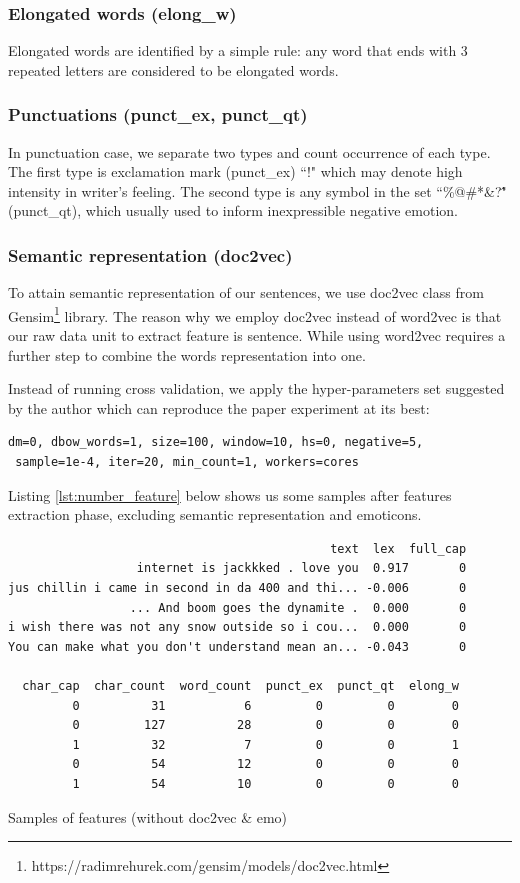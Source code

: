 \documentclass[12pt]{article}
\begin{document}
\subsubsection{Elongated words (elong\_w)}
Elongated words are identified by a simple rule: any word that ends with 3 repeated letters are considered to be elongated words.

\subsubsection{Punctuations (punct\_ex, punct\_qt)}
In punctuation case, we separate two types and count occurrence of each type. The first type is exclamation mark (punct\_ex) ``!" which may denote high intensity in writer's feeling. The second type is any symbol in the set ``\%@\#*\&?\^" (punct\_qt), which usually used to inform inexpressible negative emotion.

\subsubsection{Semantic representation (doc2vec)}
To attain semantic representation of our sentences, we use doc2vec class from Gensim\footnote{https://radimrehurek.com/gensim/models/doc2vec.html} library. The reason why we employ doc2vec instead of word2vec is that our raw data unit to extract feature is sentence. While using word2vec requires a further step to combine the words representation into one.

Instead of running cross validation, we apply the hyper-parameters set suggested by the author which can reproduce the paper experiment at its best:
\begin{verbatim}
dm=0, dbow_words=1, size=100, window=10, hs=0, negative=5,
 sample=1e-4, iter=20, min_count=1, workers=cores
\end{verbatim}

Listing \ref{lst:number_feature} below shows us some samples after features extraction phase, excluding semantic representation and emoticons.

\begin{listing}[H]
	\begin{verbatim}
                                             text  lex  full_cap
                  internet is jackkked . love you  0.917       0
jus chillin i came in second in da 400 and thi... -0.006       0
                 ... And boom goes the dynamite .  0.000       0
i wish there was not any snow outside so i cou...  0.000       0
You can make what you don't understand mean an... -0.043       0

  char_cap  char_count  word_count  punct_ex  punct_qt  elong_w
         0          31           6         0         0        0
         0         127          28         0         0        0
         1          32           7         0         0        1
         0          54          12         0         0        0
         1          54          10         0         0        0
	\end{verbatim}
	\caption{Samples of features (without doc2vec \& emo)}
	\label{lst:number_feature}
\end{listing}
\end{document}

